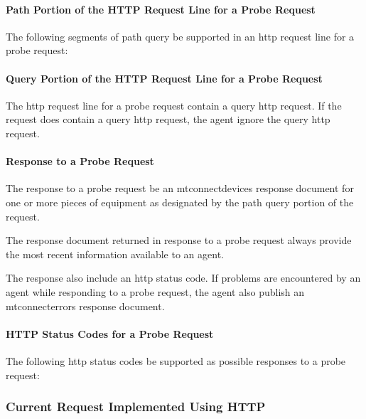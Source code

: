 \paragraph{Path Portion of the HTTP Request Line for a Probe Request}\mbox{}

The following segments of \gls{path query} \MUST be supported in an \gls{http request line} for a \gls{probe request}: 



\paragraph{Query Portion of the HTTP Request Line for a Probe Request}\mbox{}

The \gls{http request line} for a \gls{probe request} \SHOULDNOT contain a \gls{query http request}.  If the \gls{request} does contain a \gls{query http request}, the \gls{agent} \MUST ignore the \gls{query http request}.  

\paragraph{Response to a Probe Request}\mbox{}

The \gls{response} to a \gls{probe request} \SHOULD be an \gls{mtconnectdevices response document} for one or more pieces of equipment as designated by the \gls{path query} portion of the \gls{request}.

The \gls{response document} returned in response to a \gls{probe request} \MUST always provide the most recent information available to an \gls{agent}.

The \gls{response} \MUST also include an \gls{http status code}.   If problems are encountered by an \gls{agent} while responding to a \gls{probe request}, the \gls{agent} \MUST also publish an \gls{mtconnecterrors response document}.

\paragraph{HTTP Status Codes for a Probe Request}\mbox{}

The following \glspl{http status code} \MUST be supported as possible responses to a \gls{probe request}:



\pagebreak

\subsubsection{Current Request Implemented Using HTTP}
\label{sec:Current Request Implemented Using HTTP}

